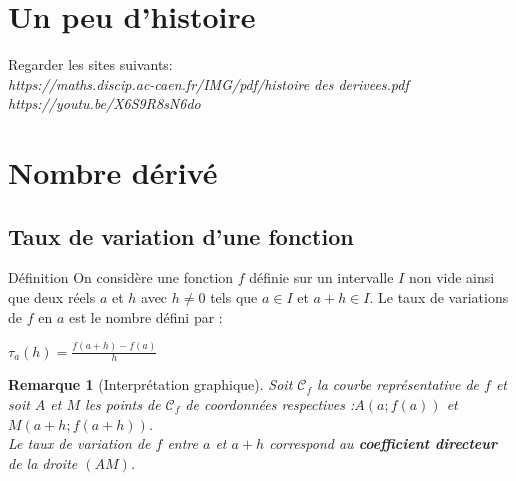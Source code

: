 \documentclass[10pt,a4paper]{article}
\theoremstyle{break}
\newtheorem{Rem}{Remarque}
\begin{document}
	
	\begin{center}
		\shadowbox{\begin{large}
				\textcolor{black}{DÉRIVATION: Première partie}
		\end{large}}
	\end{center}
\tableofcontents

\section{Un peu d'histoire}
Regarder les sites suivants:\\
\textit{https://maths.discip.ac-caen.fr/IMG/pdf/histoire des  derivees.pdf}\\
\textit{https://youtu.be/X6S9R8sN6do}
\section{Nombre dérivé}
\subsection{Taux de variation d'une fonction }
	\begin{bclogo}[couleur = yellow!30, arrondi = 0.1,logo=\bcbook]{Définition}
	On considère une fonction $f$ définie sur un intervalle $I$ non vide ainsi que deux réels $a$ et $h$ avec $h\neq 0$ tels que $a\in I$ et $a+h\in I$.
	Le {taux de variations} de $f$ en $a$  est le nombre défini par :
	\begin{center}
		\boldmath
		$\tau_a(h)=\frac{f(a+h)-f(a)}{h}$
		\unboldmath
	\end{center}
	
	\end {bclogo}
	\begin{Rem}[Interprétation graphique]
		Soit $\mathscr{C}_f$ la courbe représentative de $f$ et soit $A$ et $M$ les points de $\mathscr{C}_f$ de coordonnées respectives :$A(a;f(a))$ et $M(a+h;f(a+h))$.\\
	Le taux de variation de $f$ entre $a$ et $a+h$ correspond au \textbf{coefficient directeur} de la droite $(AM)$.\\
	\end{Rem}
\end{document}
